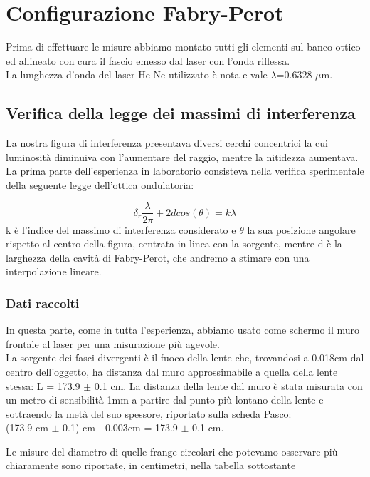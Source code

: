 \documentclass{article}
\theoremstyle{definition}
\begin{document}
\section{Configurazione Fabry-Perot}

Prima di effettuare le misure abbiamo montato tutti gli elementi sul banco ottico ed allineato con cura il fascio emesso dal laser con l'onda riflessa.\\
La lunghezza d'onda del laser He-Ne utilizzato è nota e vale $\lambda$=0.6328 $\mu$m. 


\subsection{Verifica della legge dei massimi di interferenza}
La nostra figura di interferenza presentava diversi cerchi concentrici la cui luminosità diminuiva con l'aumentare del raggio, mentre la nitidezza aumentava.\\
La prima parte dell'esperienza in laboratorio consisteva nella verifica sperimentale della seguente legge dell'ottica ondulatoria:

\[\delta_{r}\frac{\lambda}{2 \pi } + 2d cos(\theta) = k \lambda\]
  k è l'indice del massimo di interferenza considerato e \(\theta\) la sua posizione angolare rispetto al centro della figura, centrata in linea con la sorgente, mentre d è la larghezza della cavità di Fabry-Perot, che andremo a stimare con una interpolazione lineare.
\subsubsection{Dati raccolti}
In questa parte, come in tutta l'esperienza, abbiamo usato come schermo il muro frontale al laser per una misurazione più agevole.\\
La sorgente dei fasci divergenti è il fuoco della lente che, trovandosi a 0.018cm dal centro dell'oggetto, ha distanza dal muro approssimabile a quella della lente stessa: L = 173.9 $\pm$ 0.1 cm. La distanza della lente dal muro è stata misurata con un metro di sensibilità 1mm a partire dal punto più lontano della lente e sottraendo la metà del suo spessore, riportato sulla scheda Pasco:\\(173.9 cm $\pm$ 0.1) cm -  0.003cm = 173.9 $\pm$ 0.1 cm.\\

\pagebreak

Le misure del diametro di quelle frange circolari che potevamo osservare più chiaramente sono riportate, in centimetri, nella tabella sottostante
\end{document}
